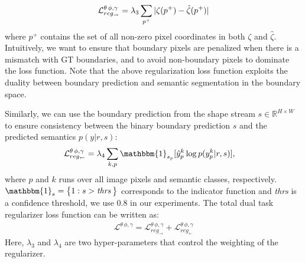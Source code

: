 \documentclass[10pt,twocolumn,letterpaper]{article}
\begin{document}
\vspace{-3mm}
\begin{align}
\label{eqn:loss_reg_edges_domain}
\mathcal{L}^{\theta\,\phi,\gamma}_{reg_\rightarrow}=\lambda_3 \sum_{p^+} |\zeta(p^+ ) -\hat \zeta(p^+)|
\vspace{-3mm}
\end{align} 
where $p^{+}$ 
contains the set of all non-zero pixel coordinates in both $\zeta$ and $\hat \zeta$.
Intuitively, we want to ensure that boundary pixels are penalized when there is a mismatch with GT boundaries,
and to avoid non-boundary pixels to dominate the loss function. 
Note that the above regularization loss function exploits the duality between boundary prediction and semantic segmentation in the boundary space.

Similarly, we can use the boundary prediction from the shape stream $s \in \mathbb{R}^{H\times W}$ to ensure consistency between the binary boundary  prediction $s$ and the predicted semantics $p(y|r,s)$:
\vspace{-3mm}
\begin{align}
\label{eqn:loss_reg_semantic_domain}
\mathcal{L}^{\theta\,\phi,\gamma}_{reg_\leftarrow} &=\lambda_4  \sum_{k,p} \mathbbm{1}_{s_p} [\hat{y}^k_{p}\log p(y^k_p| r,s) ],
\vspace{-3mm}
\end{align} 
where $p$ and $k$ runs over all image pixels and semantic classes, respectively. $ \mathbbm{1}_{s} = \left\{ \begin{array}{@{}l@{\thinspace}l} 1: s > \text{\emph{thrs}}  \end{array} \right \}$  corresponds to the indicator function and \emph{thrs} is a confidence threshold, we use 0.8 in our experiments. The total dual task regularizer loss function can be written as:
\begin{align}
\label{eqn:loss_reg}
\mathcal{L}^{\theta\,\phi,\gamma}= \mathcal{L}^{\theta\,\phi,\gamma}_{reg_\rightarrow}  +\mathcal{L}^{\theta\,\phi,\gamma}_{reg_\leftarrow} 
\end{align} 
Here, $\lambda_3$ and $\lambda_4$ are two hyper-parameters that control the weighting of the regularizer.
\end{document}
